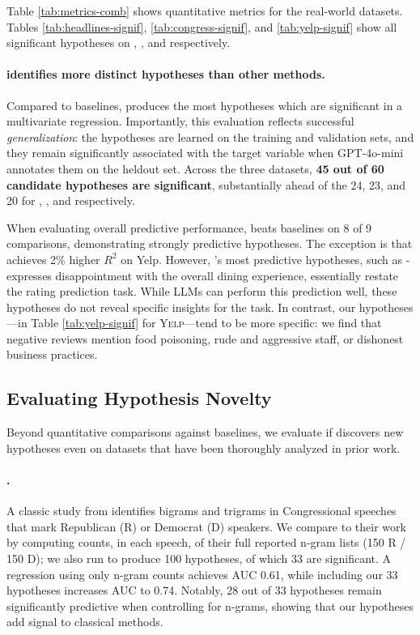 Table \ref{tab:metrics-comb} shows quantitative metrics for the real-world datasets. 
Tables \ref{tab:headlines-signif}, \ref{tab:congress-signif}, and \ref{tab:yelp-signif} show all significant hypotheses on \headlines, \congress, and \yelp respectively.


\paragraph{\ourmethod identifies more distinct hypotheses than other methods.} Compared to baselines, \ourmethod produces the most hypotheses which are significant in a multivariate regression.
Importantly, this evaluation reflects successful \textit{generalization}: the hypotheses are learned on the training and validation sets, and they remain significantly associated with the target variable when GPT-4o-mini annotates them on the heldout set.
Across the three datasets, \textbf{45 out of 60 candidate hypotheses are significant}, substantially ahead of the 24, 23, and 20 for \nlparam, \bertopic, and \hypogenic respectively. 

When evaluating overall predictive performance, \ourmethod beats baselines on 8 of 9 comparisons, demonstrating strongly predictive hypotheses. 
The exception is that \hypogenic achieves 2\% higher $R^2$ on Yelp.
However, \hypogenic's most predictive hypotheses, such as \hyp{expresses disappointment with the overall dining experience}, essentially restate the rating prediction task.
While LLMs can perform this prediction well, these hypotheses do not reveal specific insights for the task. 
In contrast, our hypotheses—in Table \ref{tab:yelp-signif} for \textsc{Yelp}—tend to be more specific: we find that negative reviews mention food poisoning, rude and aggressive staff, or dishonest business practices. 




\subsection{Evaluating Hypothesis Novelty}
\label{sec:novelty}

Beyond quantitative comparisons against baselines, we evaluate if \ourmethod discovers new hypotheses even on datasets that have been thoroughly analyzed in prior work. 


\paragraph{\congress.} A classic study from \citet{gentzkow_measuring_2016} identifies bigrams and trigrams in Congressional speeches that mark Republican (R) or Democrat (D) speakers. 
We compare to their work by computing counts, in each speech, of their full reported n-gram lists (150 R / 150 D); we also run \ourmethod to produce 100 hypotheses, of which 33 are significant.
A regression using only n-gram counts achieves AUC 0.61, while including our 33 hypotheses increases AUC to 0.74. 
Notably, 28 out of 33 hypotheses remain significantly predictive when controlling for n-grams, showing that our hypotheses add signal to classical methods.



